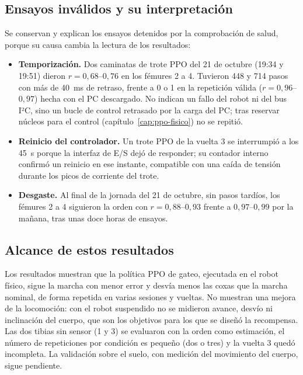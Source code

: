 \subsection{Ensayos inválidos y su interpretación}

Se conservan y explican los ensayos detenidos por la comprobación de salud,
porque su causa cambia la lectura de los resultados:
\begin{itemize}
    \item \textbf{Temporización.} Dos caminatas de trote PPO del 21 de octubre
    (19:34 y 19:51) dieron $r=0{,}68$--$0{,}76$ en los fémures 2 a 4. Tuvieron
    448 y 714 pasos con más de 40~ms de retraso, frente a 0 o 1 en la
    repetición válida ($r=0{,}96$--$0{,}97$) hecha con el PC descargado. No
    indican un fallo del robot ni del bus I²C, sino un bucle de control
    retrasado por la carga del PC; tras reservar núcleos para el control
    (capítulo~\ref{cap:ppo-fisico}) no se repitió.
    \item \textbf{Reinicio del controlador.} Un trote PPO de la vuelta 3 se
    interrumpió a los 45~s porque la interfaz de E/S dejó de responder; su contador
    interno confirmó un reinicio en ese instante, compatible con una caída de
    tensión durante los picos de corriente del trote.
    \item \textbf{Desgaste.} Al final de la jornada del 21 de octubre, sin pasos
    tardíos, los fémures 2 a 4 siguieron la orden con $r=0{,}88$--$0{,}93$
    frente a $0{,}97$--$0{,}99$ por la mañana, tras unas doce horas de
    ensayos.
\end{itemize}

\subsection{Alcance de estos resultados}

Los resultados muestran que la política PPO de gateo, ejecutada en el robot
físico, sigue la marcha con menor error y desvía menos las coxas que la marcha
nominal, de forma repetida en varias sesiones y vueltas. No muestran una mejora
de la locomoción: con el robot suspendido no se midieron avance, desvío ni
inclinación del cuerpo, que son los objetivos para los que se diseñó la
recompensa. Las dos tibias sin sensor (1 y 3) se evaluaron con la orden como
estimación, el número de repeticiones por condición es pequeño (dos o tres) y
la vuelta 3 quedó incompleta. La validación sobre el suelo, con medición del
movimiento del cuerpo, sigue pendiente.
